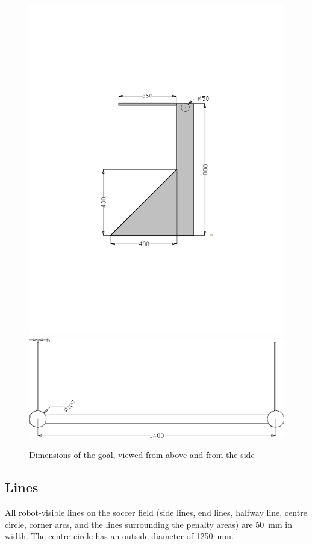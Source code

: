 \documentclass[12pt]{article}
\begin{document}
\begin{figure}[htp]
\begin{center}
\leavevmode
\includegraphics[width=0.8\columnwidth]{figs/goals2010_2.png}\\
\includegraphics[width=0.8\columnwidth]{figs/goal_with_dims_top.png}
\caption{Dimensions of the goal, viewed from above and from the side}
\label{fig:goal_dimensions}
\end{center}
\end{figure}

\subsection{Lines}\label{sec:field_lines}

All robot-visible lines on the soccer field (side lines, end lines, halfway line, centre circle, corner arcs, and the lines surrounding the penalty areas) are 50~mm in width. The centre circle has an outside diameter of 1250~mm.
\end{document}
